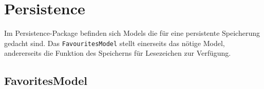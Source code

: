 
\section{Persistence}

Im Persistence-Package befinden sich Models die für eine persistente Speicherung gedacht sind. Das \lstinline|FavouritesModel| stellt einerseits das nötige Model, andererseits die Funktion des Speicherns für Lesezeichen zur Verfügung.

\subsection{FavoritesModel}


